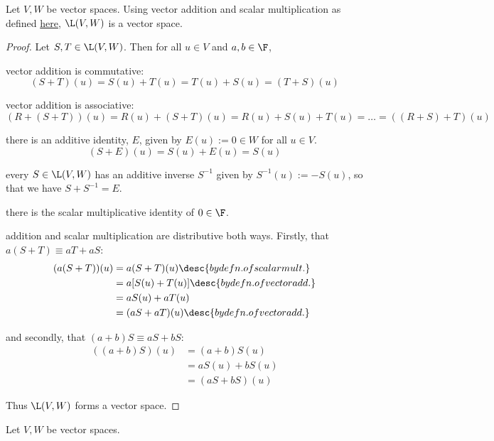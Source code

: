 \label{dc79809}

Let $V,W$ be vector spaces. Using vector addition and scalar multiplication as
defined \href{e257b42}{here}, $\L(V,W)$ is a vector space.

\begin{proof}
  Let $S,T\in\L(V,W)$. Then for all $u\in V$ and $a,b\in\F$,
  \begin{enumerati}
    \item vector addition is commutative:
    $$
      (S+T)(u)=S(u)+T(u)=T(u)+S(u)=(T+S)(u)
    $$
    \item vector addition is associative:
    $$
      (R+(S+T))(u)=R(u)+(S+T)(u)=R(u)+S(u)+T(u)=\ldots=((R+S)+T)(u)
    $$
    \item there is an additive identity, $E$, given by $E(u):=0\in W$ for all
          $u\in V$.
    $$
      (S+E)(u)=S(u)+E(u)=S(u)
    $$
    \item every $S\in\L(V,W)$ has an additive inverse $S^{-1}$ given by
          $S^{-1}(u):=-S(u)$, so that we have $S+S^{-1}=E$.
    \item there is the scalar multiplicative identity of $0\in\F$.
    \item addition and scalar multiplication are distributive both ways.
          Firstly, that $a(S+T)\equiv aT+aS$:
    \begin{align*}
      (a(S+T))(u) &=a(S+T)(u)\desc{by defn. of scalar mult.}   \\
                  &=a[S(u)+T(u)]\desc{by defn. of vector add.} \\
                  &=aS(u)+aT(u)                                \\
                  &=(aS+aT)(u)\desc{by defn. of vector add.}
    \end{align*}

    and secondly, that $(a+b)S\equiv aS+bS$:
    \begin{align*}
      ((a+b)S)(u) &=(a+b)S(u)   \\
                  &=aS(u)+bS(u) \\
                  &=(aS+bS)(u)
    \end{align*}
  \end{enumerati}

  Thus $\L(V,W)$ forms a vector space.
\end{proof}

\label{b42b8cd}

Let $V,W$ be vector spaces.

